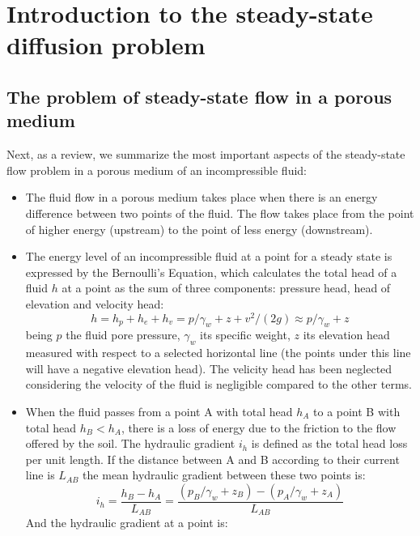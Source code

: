 \section{Introduction to the steady-state diffusion problem}

\subsection{The problem of steady-state flow in a porous medium}

Next, as a review, we summarize the most important aspects of the
steady-state flow problem in a porous medium of an incompressible fluid:
\begin{itemize}
\item The fluid flow in a porous medium takes place when there is an
  energy difference between two points of the fluid. The flow takes
  place from the point of higher energy (upstream) to the point of
  less energy (downstream).
\item The energy level of an incompressible fluid at a point for a
  steady state is expressed by the Bernoulli's Equation, which
  calculates the total head of a fluid $h$ at a point as the sum of
  three components: pressure head, head of elevation and velocity
  head:
  \begin{equation}
    \label{eq:0101}
    h=h_p+h_e+h_v=p/\gamma_w+z+v^2/(2g)\approx p/\gamma_w+z
  \end{equation}
  being $p$ the fluid pore pressure, $\gamma_w$ its specific weight,
  $z$ its elevation head measured with respect to a selected
  horizontal line (the points under this line will have a negative
  elevation head). The velicity head has been neglected considering
  the velocity of the fluid is negligible compared to the other terms.
\item When the fluid passes from a point A with total head $ h_A $ to
  a point B with total head $ h_B <h_A $, there is a loss of energy
  due to the friction to the flow offered by the soil. The hydraulic
  gradient $ i_h $ is defined as the total head loss per unit
  length. If the distance between A and B according to their current
  line is $ L_{AB}$ the mean hydraulic gradient between these two
  points is:
  \begin{equation}
    \label{eq:0102}
    i_h=\frac{h_B-h_A}{L_{AB}}=\frac{(p_B/\gamma_w+z_B)-(p_A/\gamma_w+z_A)}{L_{AB}}
  \end{equation}
  And the hydraulic gradient at a point is:
  \begin{equation}

\end{equation}
\end{itemize}
